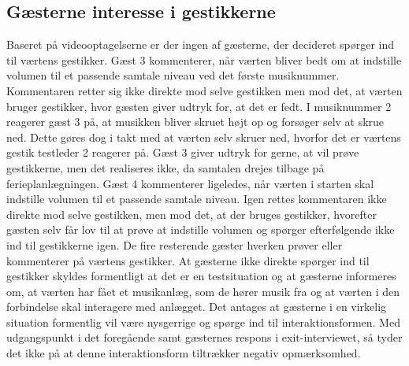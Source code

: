 \subsection{Gæsterne interesse i gestikkerne}
\label{TestresultaterSocialAcceptGaestSPGGestikker}
%
Baseret på videooptagelserne er der ingen af gæsterne, der decideret spørger ind til værtens gestikker. Gæst 3 kommenterer, når værten bliver bedt om at indstille volumen til et passende samtale niveau ved det første musiknummer. Kommentaren retter sig ikke direkte mod selve gestikken men mod det, at værten bruger gestikker, hvor gæsten giver udtryk for, at det er fedt. I musiknummer 2 reagerer gæst 3 på, at musikken bliver skruet højt op og forsøger selv at skrue ned. Dette gøres dog i takt med at værten selv skruer ned, hvorfor det er værtens gestik testleder 2 reagerer på. Gæst 3 giver udtryk for gerne, at vil prøve gestikkerne, men det realiseres ikke, da samtalen drejes tilbage på ferieplanlægningen. Gæst 4 kommenterer ligeledes, når værten i starten skal indstille volumen til et passende samtale niveau. Igen rettes kommentaren ikke direkte mod selve gestikken, men mod det, at der bruges gestikker, hvorefter gæsten selv får lov til at prøve at indstille volumen og spørger efterfølgende ikke ind til gestikkerne igen. De fire resterende gæster hverken prøver eller kommenterer på værtens gestikker. At gæsterne ikke direkte spørger ind til gestikker skyldes formentligt at det er en testsituation og at gæsterne informeres om, at værten har fået et musikanlæg, som de hører musik fra og at værten i den forbindelse skal interagere med anlægget. Det antages at gæsterne i en virkelig situation formentlig vil være nysgerrige og spørge ind til interaktionsformen. Med udgangspunkt i det foregående samt gæsternes respons i exit-interviewet, så tyder det ikke på at denne interaktionsform tiltrækker negativ opmærksomhed. 
%
